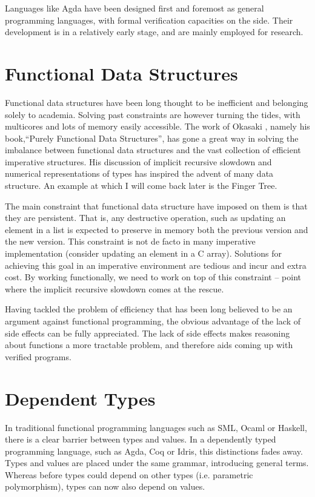 \documentclass[12pt,twoside,notitlepage]{report}
\begin{document}
Languages like Agda have been designed first and foremost as general programming languages, with formal verification capacities on the side. Their development is in a relatively early stage, and are mainly employed for research. 

\section{Functional Data Structures}

Functional data structures have been long thought to be inefficient and belonging solely to academia. Solving past constraints are however turning the tides, with multicores and lots of memory easily accessible. The work of Okasaki \cite{okasaki}, namely his book,“Purely Functional Data Structures”, has gone a great way in solving the imbalance between functional data structures and the vast collection of efficient imperative structures. His discussion of implicit recursive slowdown and numerical representations of types has inspired the advent of many data structure. An example at which I will come back later is the Finger Tree.

The main constraint that functional data structure have imposed on them is that they are persistent. That is, any destructive operation, such as updating an element in a list is expected to preserve in memory both the previous version and the new version. This constraint is not de facto in many imperative implementation (consider updating an element in a C array). Solutions for achieving this goal in an imperative environment are tedious and incur and extra cost. By working functionally, we need to work on top of this constraint – point where the implicit recursive slowdown comes at the rescue.

Having tackled the problem of efficiency that has been long believed to be an argument against functional programming, the obvious advantage of the lack of side effects can be fully appreciated. The lack of side effects makes reasoning about functions a more tractable problem, and therefore aids coming up with verified programs.

\section{Dependent Types}

In traditional functional programming languages such as SML, Ocaml or Haskell, there is a clear barrier between types and values. In a dependently typed programming language, such as Agda, Coq or Idris, this distinctions fades away. Types and values are placed under the same grammar, introducing general terms. Whereas before types could depend on other types (i.e. parametric polymorphism), types can now also depend on values.
\end{document}
